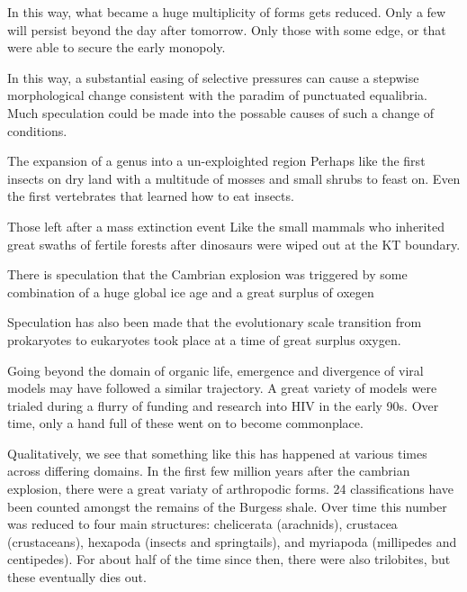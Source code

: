 In this way, what became a huge multiplicity of forms gets reduced. Only a few will persist beyond the day after tomorrow. Only those with some edge, or that were able to secure the early monopoly.

In this way, a substantial easing of selective pressures can cause a stepwise morphological change consistent with the paradim of punctuated equalibria. Much speculation could be made into the possable causes of such a change of conditions. 

The expansion of a genus into a un-exploighted region
Perhaps like the first insects on dry land with a multitude of mosses and small shrubs to feast on. 
Even the first vertebrates that learned how to eat insects. 

Those left after a mass extinction event
Like the small mammals who inherited great swaths of fertile forests after dinosaurs were wiped out at the KT boundary. 

There is speculation that the Cambrian explosion was triggered by some combination of a huge global ice age and a great surplus of oxegen

Speculation has also been made that the evolutionary scale transition from prokaryotes to eukaryotes took place at a time of great surplus oxygen. 

Going beyond the domain of organic life, emergence and divergence of viral models may have followed a similar trajectory. A great variety of models were trialed during a flurry of funding and research into HIV in the early 90s. Over time, only a hand full of these went on to become commonplace.  




Qualitatively, we see that something like this has happened at various times across differing domains. In the first few million years after the cambrian explosion, there were a great variaty of arthropodic forms. 24 classifications have been counted amongst the remains of the Burgess shale. Over time this number was reduced to four main structures: chelicerata (arachnids), crustacea (crustaceans), hexapoda (insects and springtails), and myriapoda (millipedes and centipedes). For about half of the time since then, there were also trilobites, but these eventually dies out. 



